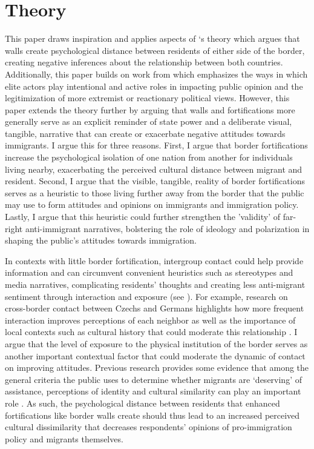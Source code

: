 \documentclass[12pt,]{article}
\begin{document}
\section{Theory}\label{theory}

This paper draws inspiration and applies aspects of \citet{mutz2022}`s
theory which argues that walls create psychological distance between
residents of either side of the border, creating negative inferences
about the relationship between both countries. Additionally, this paper
builds on work from \citet{mondon2022} which emphasizes the ways in
which elite actors play intentional and active roles in impacting public
opinion and the legitimization of more extremist or reactionary
political views. However, this paper extends the theory further by
arguing that walls and fortifications more generally serve as an
explicit reminder of state power and a deliberate visual, tangible,
narrative that can create or exacerbate negative attitudes towards
immigrants. I argue this for three reasons. First, I argue that border
fortifications increase the psychological isolation of one nation from
another for individuals living nearby, exacerbating the perceived
cultural distance between migrant and resident. Second, I argue that the
visible, tangible, reality of border fortifications serves as a
heuristic to those living further away from the border that the public
may use to form attitudes and opinions on immigrants and immigration
policy. Lastly, I argue that this heuristic could further strengthen the
'validity' of far-right anti-immigrant narratives, bolstering the role
of ideology and polarization in shaping the public's attitudes towards
immigration.

In contexts with little border fortification, intergroup contact could
help provide information and can circumvent convenient heuristics such
as stereotypes and media narratives, complicating residents' thoughts
and creating less anti-migrant sentiment through interaction and
exposure (see \citet{pettigrew2006}). For example, research on
cross-border contact between Czechs and Germans highlights how more
frequent interaction improves perceptions of each neighbor as well as
the importance of local contexts such as cultural history that could
moderate this relationship \citep{mirwaldt2010}. I argue that the level
of exposure to the physical institution of the border serves as another
important contextual factor that could moderate the dynamic of contact
on improving attitudes. Previous research provides some evidence that
among the general criteria the public uses to determine whether migrants
are `deserving' of assistance, perceptions of identity and cultural
similarity can play an important role
\citep{deconinck2020a, carmel2021}. As such, the psychological distance
between residents that enhanced fortifications like border walls create
should thus lead to an increased perceived cultural dissimilarity that
decreases respondents' opinions of pro-immigration policy and migrants
themselves.
\end{document}
